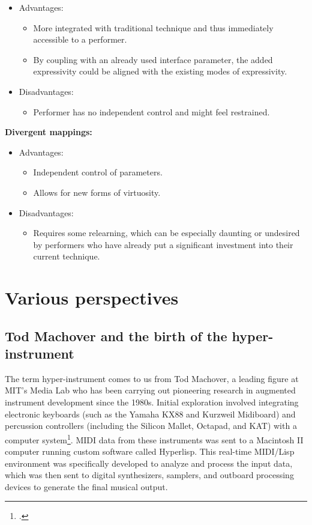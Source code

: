 \documentclass[12pt,twoside,maitrise]{dms_ks}
\theoremstyle{definition}
\begin{document}
{\begin{itemize}
  \item Advantages:
  \begin{itemize}
    \item More integrated with traditional technique and thus immediately accessible to a performer.
    \item By coupling with an already used interface parameter, the added expressivity could be aligned with the existing modes of expressivity.
  \end{itemize}
  \item Disadvantages:
  \begin{itemize}
    \item Performer has no independent control and might feel restrained.
  \end{itemize}
\end{itemize}

\textbf{Divergent mappings:}

\begin{itemize}
  \item Advantages:
  \begin{itemize}
    \item Independent control of parameters.
    \item Allows for new forms of virtuosity.
  \end{itemize}
  \item Disadvantages:
  \begin{itemize}
    \item Requires some relearning, which can be especially daunting or undesired by performers who have already put a significant investment into their current technique.
  \end{itemize}
\end{itemize}

\section{Various perspectives}

\subsection{Tod Machover and the birth of the hyper-instrument}

The term hyper-instrument comes to us from Tod Machover, a leading figure at MIT's Media Lab who has been carrying out pioneering research in augmented instrument development since the 1980s. 
Initial exploration involved integrating electronic keyboards (such as the Yamaha KX88 and Kurzweil Midiboard) and percussion controllers (including the Silicon Mallet, Octapad, and KAT) with a computer system\footcite[186]{machover_hyper-instruments_1989}. 
MIDI data from these instruments was sent to a Macintosh II computer running custom software called Hyperlisp.
This real-time MIDI/Lisp environment was specifically developed to analyze and process the input data, which was then sent to digital synthesizers, samplers, and outboard processing devices to generate the final musical output.

}
\end{document}
